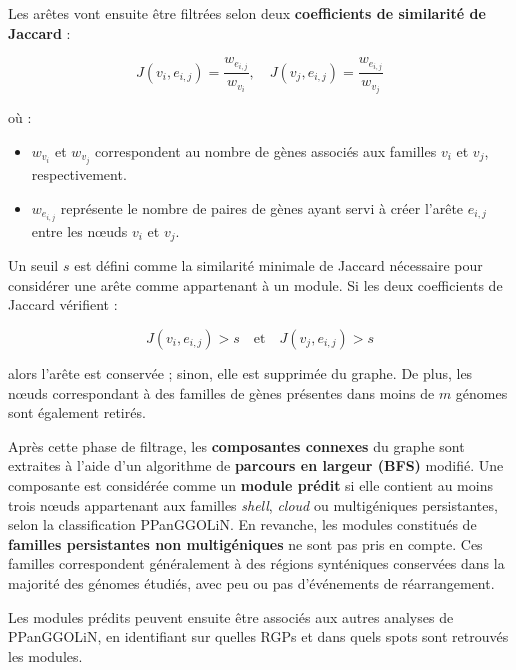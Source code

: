 Les arêtes vont ensuite être filtrées selon deux \textbf{coefficients de similarité de Jaccard} :

\begin{equation}
J(v_i, e_{i,j}) = \frac{w_{e_{i,j}}}{w_{v_i}}, \quad J(v_j, e_{i,j}) = \frac{w_{e_{i,j}}}{w_{v_j}}
\label{eq:jaccard}
\end{equation}

où :
\begin{itemize}
    \item $w_{v_i}$ et $w_{v_j}$ correspondent au nombre de gènes associés aux familles $v_i$ et $v_j$, respectivement.
    \item $w_{e_{i,j}}$ représente le nombre de paires de gènes ayant servi à créer l’arête $e_{i,j}$ entre les nœuds $v_i$ et $v_j$.
\end{itemize}

Un seuil $s$ est défini comme la similarité minimale de Jaccard nécessaire pour considérer une arête comme appartenant à un module. Si les deux coefficients de Jaccard vérifient :

\begin{equation}
J(v_i, e_{i,j}) > s \quad \text{et} \quad J(v_j, e_{i,j}) > s
\end{equation}

alors l’arête est conservée ; sinon, elle est supprimée du graphe. De plus, les n\oe uds correspondant à des familles de gènes présentes dans moins de $m$ génomes sont également retirés.

Après cette phase de filtrage, les \textbf{composantes connexes} du graphe sont extraites à l’aide d’un algorithme de \textbf{parcours en largeur (BFS)} modifié. Une composante est considérée comme un \textbf{module prédit} si elle contient au moins trois n\oe uds appartenant aux familles \textit{shell}, \textit{cloud} ou multigéniques persistantes, selon la classification PPanGGOLiN. En revanche, les modules constitués de \textbf{familles persistantes non multigéniques} ne sont pas pris en compte. Ces familles correspondent généralement à des régions synténiques conservées dans la majorité des génomes étudiés, avec peu ou pas d’événements de réarrangement.

Les modules prédits peuvent ensuite être associés aux autres analyses de PPanGGOLiN, en identifiant sur quelles RGPs et dans quels spots sont retrouvés les modules.